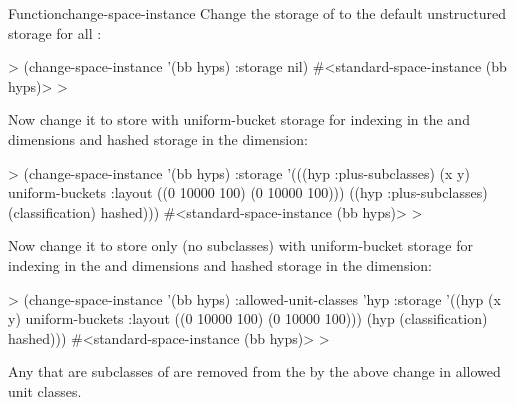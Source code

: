 \documentclass[10pt,twoside,english,pdftex]{article}
\begin{document}
\begin{functiondoc}{Function}{change-space-instance}{%
    }
\fnexamples
%
Change the storage of   to the
default unstructured storage for all :
%
\W\supp
\begin{example}
  > (change-space-instance '(bb hyps) :storage nil)
  #<standard-space-instance (bb hyps)>
  >
\end{example}
%
Now change it to store   with uniform-bucket
storage for indexing in the  and  dimensions and hashed
storage in the  dimension:
%
\W\supp\notpretop
\begin{example}
  > (change-space-instance '(bb hyps)
       :storage '(((hyp :plus-subclasses) (x y) 
                    uniform-buckets :layout ((0 10000 100)
                                             (0 10000 100)))
                  ((hyp :plus-subclasses) (classification) 
                    hashed)))
  #<standard-space-instance (bb hyps)>
  >
\end{example}
%
Now change it to store only   (no subclasses)
with uniform-bucket storage for indexing in the  and 
dimensions and hashed storage in the  dimension:
%
\W\supp\notpretop
\begin{example}
  > (change-space-instance '(bb hyps)
       :allowed-unit-classes 'hyp     
       :storage '((hyp (x y) 
                   uniform-buckets :layout ((0 10000 100)
                                            (0 10000 100)))
                  (hyp (classification) hashed)))
  #<standard-space-instance (bb hyps)>
  > 
\end{example}
%
Any  that are subclasses of  are removed from
the   by the above change in
allowed unit classes.

\end{functiondoc}

\end{document}
